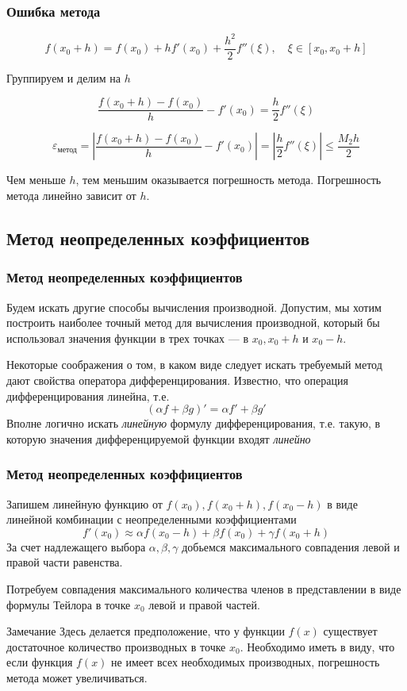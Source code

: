 \documentclass[aspectratio=43,unicode]{beamer}
\begin{document}
\begin{frame}
\frametitle{Ошибка метода}
	\[
	f(x_0 + h) = f(x_0) + h f'(x_0) + \frac{h^2}{2} f''(\xi), \quad \xi \in [x_0,x_0+h]
	\]

	Группируем и делим на $h$

	\[
	\frac{f(x_0 + h) - f(x_0)}{h} - f'(x_0) = \frac{h}{2} f''(\xi)
	\]

	\[
	\varepsilon_{\text{метод}} = \left|\frac{f(x_0 + h) - f(x_0)}{h} - f'(x_0) \right| = \left |\frac{h}{2} f''(\xi) \right | \leqslant \frac{M_2 h}{2}
	\]

	Чем меньше $h$, тем меньшим оказывается погрешность метода. Погрешность метода линейно зависит от $h$.
\end{frame}

\subsection{Метод неопределенных коэффициентов}
\begin{frame}
\frametitle{Метод неопределенных коэффициентов}
	Будем искать другие способы вычисления производной. Допустим, мы хотим построить наиболее
	точный метод для вычисления производной, который бы использовал значения функции в трех точках ---
	в $x_0, x_0+h$ и $x_0-h$.

	Некоторые соображения о том, в каком виде следует искать требуемый метод дают свойства оператора дифференцирования.
	Известно, что операция дифференцирования линейна, т.е.
	\[
	(\alpha f + \beta g)' = \alpha f' + \beta g'
	\]
	Вполне логично искать \emph{линейную} формулу дифференцирования, т.е. такую, в которую значения дифференцируемой функции входят
	\emph{линейно}
\end{frame}

\begin{frame}
\frametitle{Метод неопределенных коэффициентов}
	Запишем линейную функцию от $f(x_0), f(x_0+h), f(x_0-h)$ в виде линейной комбинации с неопределенными коэффициентами
	\[
	f'(x_0) \approx \alpha f(x_0-h)  + \beta f(x_0) + \gamma f(x_0+h)
	\]
	За счет надлежащего выбора $\alpha, \beta, \gamma$ добьемся максимального совпадения левой и правой части равенства.

	\pause
	Потребуем совпадения максимального количества членов в представлении в виде формулы Тейлора в точке $x_0$ левой и правой частей.
	\begin{block}{Замечание}
	Здесь делается предположение, что у функции $f(x)$ существует достаточное количество производных в точке $x_0$.
	Необходимо иметь в виду, что если функция $f(x)$ не имеет всех необходимых производных, погрешность метода может увеличиваться.
	\end{block}
\end{frame}
\end{document}
